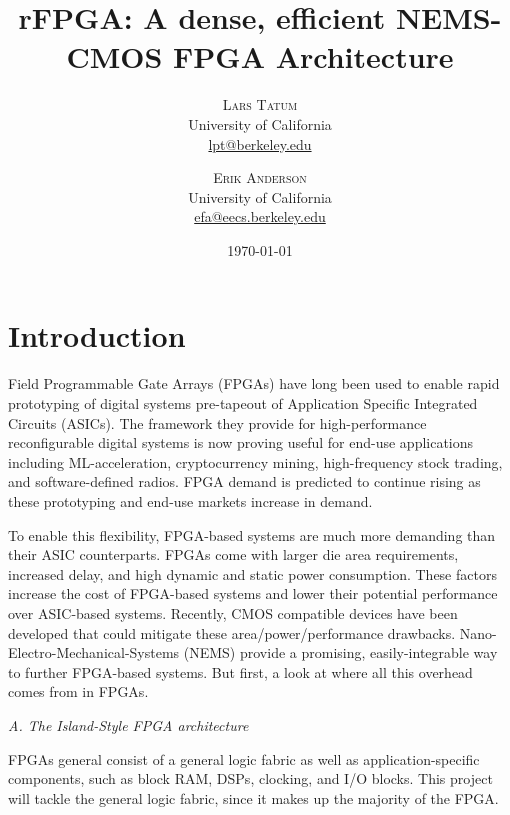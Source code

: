 \documentclass[twoside,twocolumn]{article}
\title{rFPGA: A dense, efficient NEMS-CMOS FPGA Architecture} %
\author{%
\textsc{Lars Tatum}\\[1ex] %
\normalsize University of California \\ %
\normalsize \href{mailto:lpt@berkeley.edu}{lpt@berkeley.edu} %
\and %
\textsc{Erik Anderson}\\[1ex] %
\normalsize University of California \\ %
\normalsize \href{mailto:efa@eecs.berkeley.edu}{efa@eecs.berkeley.edu} %
}
\date{\today} %
\begin{document}
\maketitle


\section{Introduction}
Field Programmable Gate Arrays (FPGAs) have long been used to enable rapid prototyping of digital systems pre-tapeout of Application Specific Integrated Circuits (ASICs)\cite{8187326}. The framework they provide for high-performance reconfigurable digital systems is now proving useful for end-use applications including ML-acceleration, cryptocurrency mining, high-frequency stock trading, and software-defined radios. FPGA demand is predicted to continue rising as these prototyping and end-use markets increase in demand.

To enable this flexibility, FPGA-based systems are much more demanding than their ASIC counterparts. FPGAs come with larger die area requirements, increased delay, and high dynamic and static power consumption. These factors increase the cost of FPGA-based systems and lower their potential performance over ASIC-based systems. Recently, CMOS compatible devices have been developed that could mitigate these area/power/performance drawbacks.  Nano-Electro-Mechanical-Systems (NEMS) provide a promising, easily-integrable way to further FPGA-based systems. But first, a look at where all this overhead comes from in FPGAs.

\textit{A. The Island-Style FPGA architecture}

FPGAs general consist of a general logic fabric as well as application-specific components, such as block RAM, DSPs, clocking, and I/O blocks\cite{8187326}. This project will tackle the general logic fabric, since it makes up the majority of the FPGA.
\end{document}
